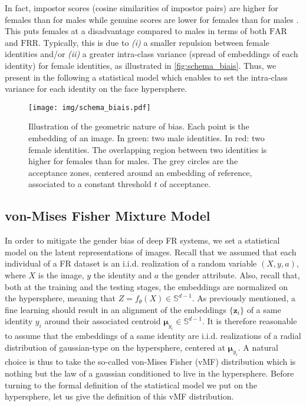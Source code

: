 \documentclass[nohyperref]{article}
\theoremstyle{plain}
\theoremstyle{definition}
\theoremstyle{remark}
\newcommand{\vect}[1]{{\bm{#1}}}
\begin{document}
In fact, impostor scores (cosine similarities of impostor pairs) are higher for females than for males while genuine scores are lower for females than for males \cite{nist_report_2019, too_bias_or_not}. This puts females at a disadvantage compared to males in terms of both $\mathrm{FAR}$ and $\mathrm{FRR}$. Typically, this is due to {\it(i)} a smaller repulsion between female identities and/or {\it(ii)} a greater intra-class variance (spread of embeddings of each identity) for female identities, as illustrated in \autoref{fig:schema_biais}. Thus, we present in the following a statistical model which enables to set the intra-class variance for each identity on the face hypersphere.



\begin{figure}[ht!]
    \centering
    \texttt{[image: img/schema\_biais.pdf]}
    \caption{Illustration of the geometric nature of bias. Each point is the embedding of an image. In green: two male identities. In red: two female identities. The overlapping region between two identities is higher for females than for males. The grey circles are the acceptance zones, centered around an embedding of reference, associated to a constant threshold $t$ of acceptance.}
    \label{fig:schema_biais}
    \vspace{-0.3cm}
\end{figure}



\subsection{von-Mises Fisher Mixture Model}\label{subsec:vMF_Loss}




In order to mitigate the gender bias of deep FR systems, we set a statistical model on the latent representations of images. Recall that we assumed that each individual of a FR dataset is an i.i.d. realization of a random variable $(X,y,a)$, where $X$ is the image, $y$ the identity and $a$ the gender attribute. Also, recall that, both at the training and the testing stages, the embeddings are normalized on the hypersphere, meaning that $Z=f_\theta(X) \in \mathbb{S}^{d-1}$. As previously mentioned, a fine learning should result in an alignment of the embeddings $\{\vect{z}_i\}$ of a same identity $y_i$ around their associated centroid $\vect{\mu}_{y_i} \in \mathbb{S}^{d-1}$. It is therefore reasonable to assume that the embeddings of a same identity are i.i.d. realizations of a radial distribution of gaussian-type on the hypersphere, centered at $\vect{\mu}_{y_i}$. A natural choice is thus to take the so-called von-Mises Fisher (vMF) distribution which is nothing but the law of a gaussian conditioned to live in the hypersphere. Before turning to the formal definition of the statistical model we put on the hypersphere, let us give the definition of this vMF distribution. 
\end{document}
